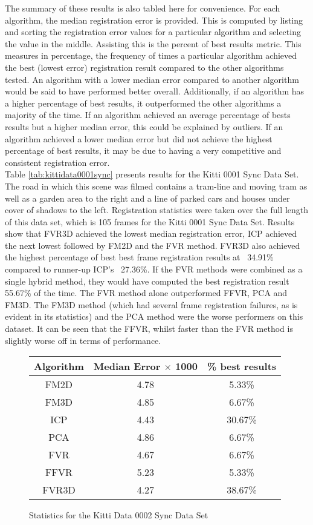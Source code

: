 The summary of these results is also tabled here for convenience. For each algorithm, the median registration error is provided. This is computed by listing and sorting the registration error values for a particular algorithm and selecting the value in the middle. Assisting this is the percent of best results metric. This measures in percentage, the frequency of times a particular algorithm achieved the best (lowest error) registration result compared to the other algorithms tested. An algorithm with a lower median error compared to another algorithm would be said to have performed better overall. Additionally, if an algorithm has a higher percentage of best results, it outperformed the other algorithms a majority of the time. If an algorithm achieved an average percentage of bests results but a higher median error, this could be explained by outliers. If an algorithm achieved a lower median error but did not achieve the highest percentage of best results, it may be due to having a very competitive and consistent registration error. \\

Table \ref{tab:kittidata0001sync} presents results for the Kitti 0001 Sync Data Set. The road in which this scene was filmed contains a tram-line and moving tram as well as a garden area to the right and a line of parked cars and houses under cover of shadows to the left. Registration statistics were taken over the full length of this data set, which is 105 frames for the Kitti 0001 Sync Data Set. Results show that FVR3D achieved the lowest median registration error, ICP achieved the next lowest followed by FM2D and the FVR method. FVR3D also achieved the highest percentage of best best frame registration results at ~34.91\% compared to runner-up ICP's ~27.36\%. If the FVR methods were combined as a single hybrid method, they would have computed the best registration result 55.67\% of the time. The FVR method alone outperformed FFVR, PCA and FM3D. The FM3D method (which had several frame registration failures, as is evident in its statistics) and the PCA method were the worse performers on this dataset. It can be seen that the FFVR, whilst faster than the FVR method is slightly worse off in terms of performance. \\ 



\begin{figure}
\centering
\begin{tabular}{ccc}
\hline
\textbf{Algorithm} & \textbf{Median Error $\times$ 1000} & \textbf{\% best results}\\ \hline
FM2D	& 4.78 & 5.33\%\\
FM3D	& 4.85 & 6.67\%\\
ICP	& 4.43 & 30.67\%\\
PCA	& 4.86 & 6.67\%\\
FVR	& 4.67 & 6.67\%\\
FFVR	& 5.23 & 5.33\%\\
FVR3D	& 4.27 & 38.67\%\\
\end{tabular}
\caption{Statistics for the Kitti Data 0002 Sync Data Set}
\label{tab:kittidata0002sync}
\end{figure} 


